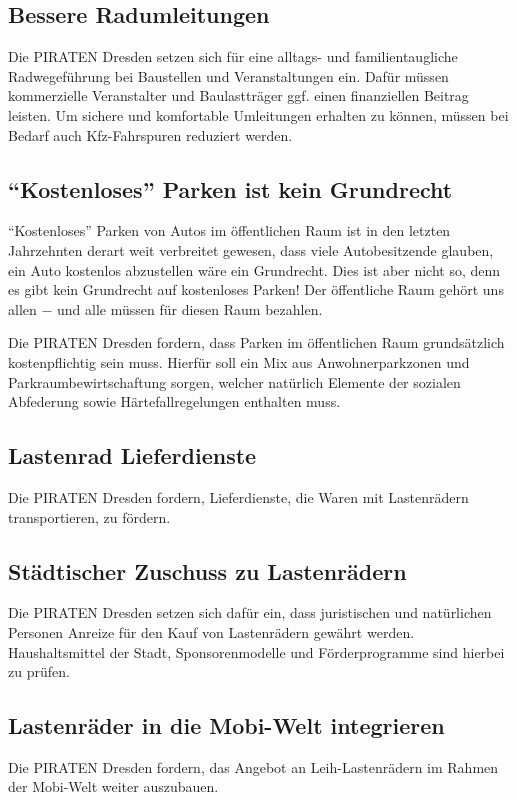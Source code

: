 \documentclass[a4paper, 11pt]{article}
\begin{document}
\subsection{Bessere Radumleitungen}
Die PIRATEN Dresden setzen sich für eine alltags- und familientaugliche Radwegeführung bei Baustellen und Veranstaltungen ein. Dafür müssen kommerzielle Veranstalter und Baulastträger ggf. einen finanziellen Beitrag leisten. Um sichere und komfortable Umleitungen erhalten zu können, müssen bei Bedarf auch Kfz-Fahrspuren reduziert werden.


\subsection{``Kostenloses'' Parken ist kein Grundrecht}
``Kostenloses'' Parken von Autos im öffentlichen Raum ist in den letzten Jahrzehnten derart weit verbreitet gewesen, dass viele Autobesitzende glauben, ein Auto kostenlos abzustellen wäre ein Grundrecht. Dies ist aber nicht so, denn es gibt kein Grundrecht auf kostenloses Parken! Der öffentliche Raum gehört uns allen $-$ und alle müssen für diesen Raum bezahlen.

Die PIRATEN Dresden fordern, dass Parken im öffentlichen Raum grundsätzlich kostenpflichtig sein muss. Hierfür soll ein Mix aus Anwohnerparkzonen und Parkraumbewirtschaftung sorgen, welcher natürlich Elemente der sozialen Abfederung sowie Härtefallregelungen enthalten muss.


\subsection{Lastenrad Lieferdienste}
Die PIRATEN Dresden fordern, Lieferdienste, die Waren mit Lastenrädern transportieren, zu fördern.


\subsection{Städtischer Zuschuss zu Lastenrädern}
Die PIRATEN Dresden setzen sich dafür ein, dass juristischen und natürlichen Personen Anreize für den Kauf von Lastenrädern gewährt werden. Haushaltsmittel der Stadt, Sponsorenmodelle und Förderprogramme sind hierbei zu prüfen.


\subsection{Lastenräder in die Mobi-Welt integrieren}
Die PIRATEN Dresden fordern, das Angebot an Leih-Lastenrädern im Rahmen der Mobi-Welt weiter auszubauen.
\end{document}
